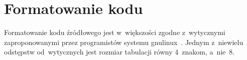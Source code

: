 \documentclass[thesis]{subfiles}
\begin{document}
%
%
%
%
%
%
%
%
%
%
%
%
%

\section{Formatowanie kodu}

Formatowanie kodu źródłowego jest w~większości zgodne z~wytycznymi zaproponowanymi przez programistów  systemu \gls{gnulinux}~\cite{kernel-coding-style}. Jednym z~niewielu odstępstw od~wytycznych jest rozmiar tabulacji równy 4~znakom, a~nie~8.
\end{document}
